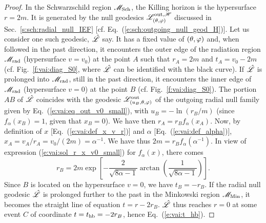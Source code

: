 \begin{proof}
In the Schwarzschild region $\mathscr{M}_{\rm Sch}$, the Killing horizon is the hypersurface
$r = 2m$. It is generated by the null geodesics $\mathscr{L}^{{\rm out},\mathscr{H}}_{(\theta,\varphi)}$
discussed in Sec.~\ref{s:sch:radial_null_IEF} [cf. Eq.~(\ref{e:sch:outgoing_null_geod_H})].
Let us consider one such geodesic, $\hat{\mathscr{L}}$ say.
It has a fixed value of $(\theta,\varphi)$ and, when followed in the past direction,
it encounters the outer edge of the radiation region $\mathscr{M}_{\rm rad}$
(hypersurface $v=v_0$) at the point $A$ such that $r_A = 2m$ and $t_A = v_0 - 2m$
(cf. Fig.~\ref{f:vai:diag_S0}, where $\hat{\mathscr{L}}$ can be identified with the
black curve). If $\hat{\mathscr{L}}$ is prolonged into $\mathscr{M}_{\rm rad}$, still in the past direction, it encounters the inner edge of $\mathscr{M}_{\rm rad}$ (hypersurface $v=0$) at the point $B$
(cf. Fig.~\ref{f:vai:diag_S0}).
The portion $AB$ of $\hat{\mathscr{L}}$ coincides with the geodesic $\mathscr{L}_{(u_B,\theta,\varphi)}^{\rm out}$
of the outgoing radial null family given by Eq.~(\ref{e:vai:eq_out_v0_small}),
with $u_B = - \ln(r_B / m)$ (since $f_\alpha(x_B)=1$, given that $x_B = 0$).
We have then $r_A = r_B f_\alpha(x_A)$.
Now, by definition of $x$ [Eq.~(\ref{e:vai:def_x_v_r})] and
$\alpha$ [Eq.~(\ref{e:vai:def_alpha})],
$x_A = v_A / r_A = v_0 / (2m) = \alpha^{-1}$.
We have thus $2 m = r_B f_\alpha(\alpha^{-1})$. In view of expression
(\ref{e:vai:sol_r_x_v0_small}) for $f_\alpha(x)$, there comes
\[
    r_B = 2 m \exp \left[ - \frac{2}{\sqrt{8\alpha - 1}}
    \arctan\left( \frac{1}{\sqrt{8\alpha - 1}} \right) \right] .
\]
Since $B$ is located on the hypersurface $v=0$, we have $t_B = - r_B$.
If the radial null geodesic $\hat{\mathscr{L}}$
is prolonged further to the past in the Minkowski
region $\mathscr{M}_{\rm Min}$, it becomes the straight line of equation $t = r - 2 r_B$.
$\hat{\mathscr{L}}$ thus reaches $r=0$ at some event $C$ of
coordinate $t = t_{\rm hb} = -2 r_B$, hence Eq.~(\ref{e:vai:t_hb}).


\end{proof}
